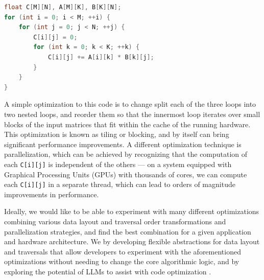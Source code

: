 \begin{lstlisting}[language=C++, caption={Matrix multiplication}, label={lst:matrix-multiplication}]
float C[M][N], A[M][K], B[K][N];
for (int i = 0; i < M; ++i) {
    for (int j = 0; j < N; ++j) {
        C[i][j] = 0;
        for (int k = 0; k < K; ++k) {
            C[i][j] += A[i][k] * B[k][j];
        }
    }
}
\end{lstlisting}

A simple optimization to this code is to change split each of the three loops into two nested loops, and reorder them so that the innermost loop iterates over small blocks of the input matrices that fit within the cache of the running hardware. This optimization is known as tiling or blocking, and by itself can bring significant performance improvements. A different optimization technique is parallelization, which can be achieved by recognizing that the computation of each \lstinline{C[i][j]} is independent of the others --- on a system equipped with Graphical Processing Units (GPUs) with thousands of cores, we can compute each \lstinline{C[i][j]} in a separate thread, which can lead to orders of magnitude improvements in performance.

Ideally, we would like to be able to experiment with many different optimizations combining various data layout and traversal order transformations and parallelization strategies, and find the best combination for a given application and hardware architecture. We  by developing flexible abstractions for data layout and traversals that allow developers to experiment with the aforementioned optimizations without needing to change the core algorithmic logic, and by exploring the potential of LLMs to assist with code optimization .

